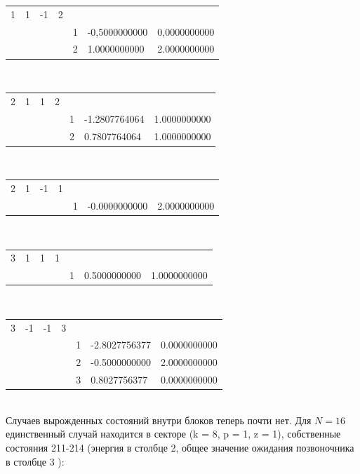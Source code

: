 \documentclass[11pt]{article}
\begin{document}
\begin{tabular}{lllllll}        
    1 & 1 & -1 & 2 & & & \\
    & & & & 1 & -0,5000000000 & 0,0000000000 \\
    & & & & 2 & 1.0000000000 & 2.0000000000 \\
\end{tabular}    \\

\begin{tabular}{lllllll}        
    2 & 1 & 1 & 2 & & & \\
    & & & & 1 & -1.2807764064 & 1.0000000000 \\
    & & & & 2 & 0.7807764064 & 1.0000000000 \\
\end{tabular}    \\

\begin{tabular}{lllllll}        
    2    & 1  &  -1  & 1 & & & \\
    & & & & 1    &  -0.0000000000 &    2.0000000000 \\
\end{tabular}    \\

\begin{tabular}{lllllll}        
    3 & 1 & 1 & 1 & & & \\
    & & & & 1   &    0.5000000000  &   1.0000000000 \\
\end{tabular}    \\

\begin{tabular}{lllllll}        
    3  &  -1  &  -1  & 3 & & & \\
    & & & & 1  &    -2.8027756377 &    0.0000000000 \\
    & & & & 2  &    -0.5000000000  &   2.0000000000 \\
    & & & & 3  &     0.8027756377  &   0.0000000000 \\
\end{tabular}    \\
    
Случаев вырожденных состояний внутри блоков теперь почти нет. Для $N = 16$ единственный случай находится в секторе (k = 8, p = 1, z = 1), собственные состояния 211-214 (энергия в столбце 2, общее значение ожидания позвоночника в столбце 3 ):\\
\end{document}
